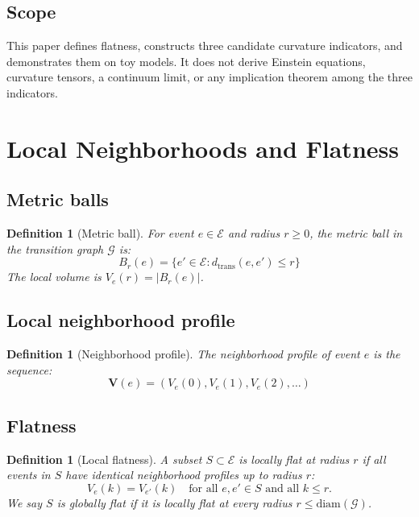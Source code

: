 \documentclass[12pt]{article}
\newtheorem{definition}[theorem]{Definition}
\newcommand{\Ecal}{\mathcal{E}}
\newcommand{\Gcal}{\mathcal{G}}
\begin{document}
\subsection*{Scope}

This paper defines flatness, constructs three candidate curvature indicators, and demonstrates them on toy models. It does not derive Einstein equations, curvature tensors, a continuum limit, or any implication theorem among the three indicators.

\section{Local Neighborhoods and Flatness}\label{sec:flat}

\subsection{Metric balls}

\begin{definition}[Metric ball]\label{def:ball}
For event $e \in \Ecal$ and radius $r \geq 0$, the metric ball in the transition graph $\Gcal$ is:
\begin{equation}
    B_r(e) = \{e' \in \Ecal : d_{\mathrm{trans}}(e, e') \leq r\}
\end{equation}
The local volume is $V_e(r) = |B_r(e)|$.
\end{definition}

\subsection{Local neighborhood profile}

\begin{definition}[Neighborhood profile]\label{def:profile}
The \textit{neighborhood profile} of event $e$ is the sequence:
\begin{equation}
    \mathbf{V}(e) = (V_e(0), V_e(1), V_e(2), \ldots)
\end{equation}
\end{definition}

\subsection{Flatness}

\begin{definition}[Local flatness]\label{def:flatness}
A subset $S \subset \Ecal$ is \textit{locally flat at radius $r$} if all events in $S$ have identical neighborhood profiles up to radius $r$:
\begin{equation}
    V_e(k) = V_{e'}(k) \quad \text{for all } e, e' \in S \text{ and all } k \leq r.
\end{equation}
We say $S$ is \textit{globally flat} if it is locally flat at every radius $r \leq \mathrm{diam}(\Gcal)$.
\end{definition}
\end{document}
